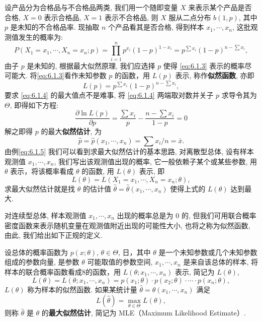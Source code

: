 \begin{example}\label{exam:6.1.5}
设产品分为合格品与不合格品两类, 我们用一个随即变量 $X$ 来表示某个产品是否合格, $X=0$ 表示合格品, $X=1$ 表示不合格品, 则 $X$ 服从二点分布 $b(1,p)$, 其中 $p$ 是未知的不合格品率. 现抽取 $n$ 个产品看其是否合格, 得到样本 $x_1,\cdots,x_n$, 这批观测值发生的概率为:
\begin{equation}\label{eq:6.1.3}
P(X_1=x_1,\cdots,X_n=x_n;p)=\prod_{i=1}^np^{x_i}(1-p)^{1-x_i}=p^{\sum x_i}(1-p)^{n-\sum x_i}, %
\end{equation}
由子 $p$ 是未知的, 根据最大似然原理, 我们应选择 $p$ 使得 \eqref{eq:6.1.3} 表示的概率尽可能大. 将\eqref{eq:6.1.3}看作未知参数 $p$ 的函数，用 $L(p)$ 表示, 称作\textbf{似然函数}, 亦即
\begin{equation}\label{eq:6.1.4}
L(p)=p^{\sum x_i}(1-p)^{n-\sum x_i},
\end{equation}
要求 \eqref{eq:6.1.4} 的最大值点不是难事, 将 \eqref{eq:6.1.4} 两端取对数并关子 $p$ 求导令其为 $\Theta$, 即得如下方程:
\begin{equation}\label{eq:6.1.5}
\frac{\partial \ln L(p)}{\partial p}=\frac{\sum x_i}{p}-\frac{n-\sum x_i}{1-p}=0
\end{equation}
解之即得 $p$ 的最大\textbf{似然估计}, 为
\[\hat{p}=\hat{p}(x_1,\cdots,x_n)=\sum x_i/n=\bar{x}. \]
由例\ref{eq:6.1.5} 我们可以看到求最大似然估计的基本思路, 对离散型总体, 设有样本观测值 $x_1,\cdots,x_n$, 我们写出该观测值出现的概率, 它一般依赖子某个或某些参数, 用 $\theta$ 表示，将该概率看成 $\theta$ 的函数, 用 $L(\theta)$ 表示, 即
\[L(\theta)=L(X_1=x_1,\cdots,X_n=x_n;\theta), \]
求最大似然估计就是找 $\theta$ 的估计值 $\hat{\theta}=\hat{\theta}(x_1,\cdots,x_n)$ 使得上式的 $L(\theta)$ 达到最大.
\end{example}

对连续型总体, 样本观测值 $x_1,\cdots,x_n$ 出现的概率总是为 0 的, 但我们可用联合概率密度函数来表示随机变量在观测值附近出现的可能性大小, 也将之称为似然函数, 由此, 我们给出如下正规的定义.

\begin{definition}{}{}%
设总体的概率函数为 $p(x;\theta)$, $\theta\in\Theta$, 日，其中 $\theta$ 是一个未知参数或几个未知参数组成的参数向量, 是参数 $\theta$ 可能取值的参数空间, $x_1,\cdots,x_n$ 是来自该总体的样本, 将样本的联合概率函数看成8的函数，用 $L(\theta;x_1,\cdots,x_n)$ 表示, 简记为 $L(\theta)$,
\begin{equation}\label{eq:6.1.6}
L(\theta)=L(\theta;x_1,\cdots,x_n)=p(x_1;\theta)\cdot p(x_2;\theta)\cdot \cdots \cdot p(x_n;\theta),
\end{equation}
$L(\theta)$ 称为样本的似然函数. 如果某统计量 $\hat{\theta}=\hat{\theta}(x_1,\cdots,x_n)$ 满足
\begin{equation}\label{eq:6.1.7}
L(\hat{\theta})=\max_{\theta\in\Theta}L(\theta),
\end{equation}
则称 $\hat{\theta}$ 是 $\theta$ 的\textbf{最大似然估计}, 简记为 MLE（Maximum Likelihood Estimate）.
\end{definition}

